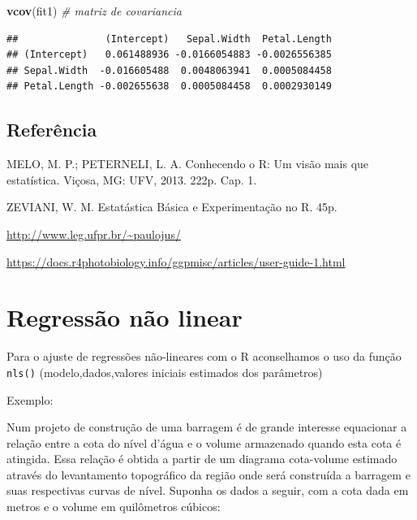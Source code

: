 \documentclass[
]{book}
\newenvironment{Shaded}{\begin{snugshade}}{\end{snugshade}}
\newcommand{\CommentTok}[1]{\textcolor[rgb]{0.56,0.35,0.01}{\textit{#1}}}
\newcommand{\KeywordTok}[1]{\textcolor[rgb]{0.13,0.29,0.53}{\textbf{#1}}}
\newcommand{\NormalTok}[1]{#1}
\begin{document}
\begin{Shaded}
\begin{Highlighting}[]
\KeywordTok{vcov}\NormalTok{(fit1) }\CommentTok{# matriz de covariancia }
\end{Highlighting}
\end{Shaded}

\begin{verbatim}
##               (Intercept)   Sepal.Width  Petal.Length
## (Intercept)   0.061488936 -0.0166054883 -0.0026556385
## Sepal.Width  -0.016605488  0.0048063941  0.0005084458
## Petal.Length -0.002655638  0.0005084458  0.0002930149
\end{verbatim}

\hypertarget{referuxeancia-6}{%
\subsection{Referência}\label{referuxeancia-6}}

MELO, M. P.; PETERNELI, L. A. Conhecendo o R: Um visão mais que estatística. Viçosa, MG: UFV, 2013. 222p. Cap. 1.

ZEVIANI, W. M. Estatástica Básica e Experimentação no R. 45p.

\url{http://www.leg.ufpr.br/~paulojus/}

\url{https://docs.r4photobiology.info/ggpmisc/articles/user-guide-1.html}

\hypertarget{regressuxe3o-nuxe3o-linear}{%
\section{Regressão não linear}\label{regressuxe3o-nuxe3o-linear}}

Para o ajuste de regressões não-lineares com o R aconselhamos o uso da função \texttt{nls()} (modelo,dados,valores iniciais estimados dos parâmetros)

Exemplo:

Num projeto de construção de uma barragem é de grande interesse equacionar a relação entre a cota do nível d'água e o volume armazenado quando esta cota é atingida. Essa relação é obtida a partir de um diagrama cota-volume estimado através do levantamento topográfico da região onde será construída a barragem e suas respectivas curvas de nível. Suponha os dados a seguir, com a cota dada em metros e o volume em quilômetros cúbicos:
\end{document}
